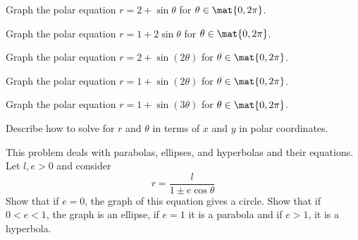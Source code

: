 \begin{enumialphparenastyle}
\begin{ex} Graph the polar equation $r=2+\sin \theta $ for $\theta \in \mat{0,2\pi}$.
\end{ex}

\begin{ex} Graph the polar equation $r=1+2\sin \theta $ for $\theta \in \mat{0,2\pi}$.
\end{ex}

\begin{ex} Graph the polar equation $r=2+\sin (2\theta) $ for $\theta \in \mat{0,2\pi 
}$.
\end{ex}

\begin{ex} Graph the polar equation $r=1+\sin (2\theta) $ for $\theta \in \mat{0,2\pi 
}$.
\end{ex}

\begin{ex} Graph the polar equation $r=1+\sin (3\theta) $ for $\theta \in \mat{0,2\pi 
}$.
\end{ex}


\begin{ex} Describe how to solve for $r$ and $\theta $ in terms of $x$ and $y$ in polar
coordinates.
\end{ex}

\begin{ex} This problem deals with parabolas, ellipses, and
hyperbolas and their equations. Let $l,e>0$ and consider
\begin{equation*}
r=\frac{l}{1\pm e\cos \theta }
\end{equation*}
Show that if $e=0$, the graph of this equation gives a circle. Show that if $0<e<1$, the graph is an ellipse, if $e=1$
it is a parabola and if $e>1$, it is a hyperbola.
\end{ex}

\end{enumialphparenastyle}